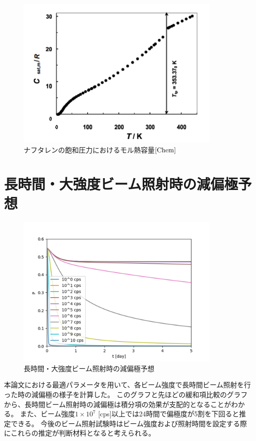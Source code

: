\begin{figure}[h]
  \centering
  \includegraphics[width=10cm]{./chap4/fig/C_T.png}
  \caption{ナフタレンの飽和圧力におけるモル熱容量$\cite{Chem}$}
  \label{C_T}
\end{figure}


\section{長時間・大強度ビーム照射時の減偏極予想}
\begin{figure}[h]
  \centering
  \includegraphics[width=10cm]{./chap4/fig/longtime.png}
  \caption{長時間・大強度ビーム照射時の減偏極予想}
\end{figure}
本論文における最適パラメータを用いて、各ビーム強度で長時間ビーム照射を行った時の減偏極の様子を計算した。
このグラフと先ほどの緩和項比較のグラフから、長時間ビーム照射時の減偏極は積分項の効果が支配的となることがわかる。
また、ビーム強度$1 \times 10^7$ [cps]以上では24時間で偏極度が5割を下回ると推定できる。
今後のビーム照射試験時はビーム強度および照射時間を設定する際にこれらの推定が判断材料となると考えられる。



